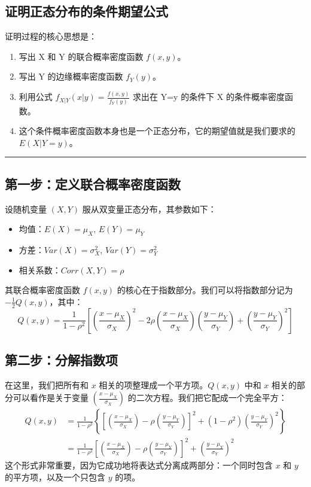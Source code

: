 \documentclass[UTF8]{ctexart}
\begin{document}
\subsection*{证明正态分布的条件期望公式}
\noindent 证明过程的核心思想是：
\begin{enumerate}
    \item 写出 X 和 Y 的联合概率密度函数 $f(x, y)$。
    \item 写出 Y 的边缘概率密度函数 $f_Y(y)$。
    \item 利用公式 $f_{X|Y}(x|y) = \frac{f(x, y)}{f_Y(y)}$ 求出在 Y=y 的条件下 X 的条件概率密度函数。
    \item 这个条件概率密度函数本身也是一个正态分布，它的期望值就是我们要求的 $E(X|Y=y)$。
\end{enumerate}

\hrule
\vspace{1em}

\subsection*{第一步：定义联合概率密度函数 }

设随机变量 $(X, Y)$ 服从双变量正态分布，其参数如下：
\begin{itemize}
    \item 均值：$E(X) = \mu_X$, $E(Y) = \mu_Y$
    \item 方差：$Var(X) = \sigma_X^2$, $Var(Y) = \sigma_Y^2$
    \item 相关系数：$Corr(X, Y) = \rho$
\end{itemize}

其联合概率密度函数 $f(x, y)$ 的核心在于指数部分。我们可以将指数部分记为 $-\frac{1}{2}Q(x,y)$，其中：
$$
Q(x,y) = \frac{1}{1-\rho^2} \left[ \left(\frac{x-\mu_X}{\sigma_X}\right)^2 - 2\rho\left(\frac{x-\mu_X}{\sigma_X}\right)\left(\frac{y-\mu_Y}{\sigma_Y}\right) + \left(\frac{y-\mu_Y}{\sigma_Y}\right)^2 \right]
$$

\subsection*{第二步：分解指数项}

在这里，我们把所有和 $x$ 相关的项整理成一个平方项。$Q(x, y)$ 中和 $x$ 相关的部分可以看作是关于变量 $(\frac{x-\mu_X}{\sigma_X})$ 的二次方程。我们把它配成一个完全平方：
\begin{align*}
Q(x,y) &= \frac{1}{1-\rho^2} \left\{ \left[ \left(\frac{x-\mu_X}{\sigma_X}\right) - \rho\left(\frac{y-\mu_Y}{\sigma_Y}\right) \right]^2 + (1-\rho^2)\left(\frac{y-\mu_Y}{\sigma_Y}\right)^2 \right\} \\
&= \frac{1}{1-\rho^2} \left[ \left(\frac{x-\mu_X}{\sigma_X}\right) - \rho\left(\frac{y-\mu_Y}{\sigma_Y}\right) \right]^2 + \left(\frac{y-\mu_Y}{\sigma_Y}\right)^2
\end{align*}
这个形式非常重要，因为它成功地将表达式分离成两部分：一个同时包含 $x$ 和 $y$ 的平方项，以及一个只包含 $y$ 的项。
\end{document}
